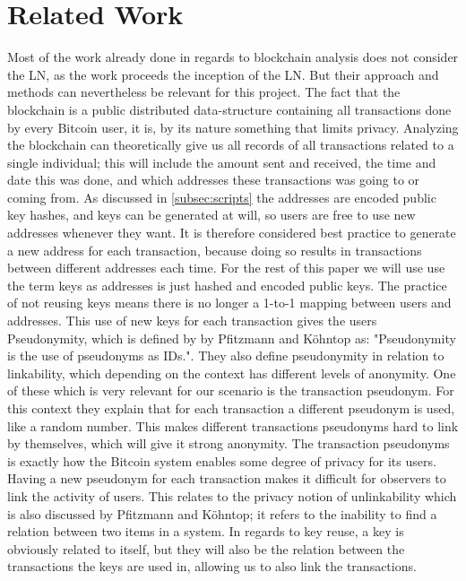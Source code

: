 
\section{Related Work}
\label{sec:related}

Most of the work already done in regards to blockchain analysis does not consider the LN, as the work proceeds the inception of the LN. But their approach and methods can nevertheless be relevant for this project.
The fact that the blockchain is a public distributed data-structure containing all transactions done by every Bitcoin user, it is, by its nature something that limits privacy. Analyzing the blockchain can theoretically give us all records of all transactions related to a single individual; this will include the amount sent and received, the time and date this was done, and which addresses these transactions was going to or coming from. As discussed in \cref{subsec:scripts} the addresses are encoded public key hashes, and keys can be generated at will, so users are free to use new addresses whenever they want. It is therefore considered best practice to generate a new address for each transaction, because doing so results in transactions between different addresses each time. For the rest of this paper we will use use the term keys as addresses is just hashed and encoded public keys. 
The practice of not reusing keys means there is no longer a 1-to-1 mapping between users and addresses.
This use of new keys for each transaction gives the users Pseudonymity, which is defined by by Pfitzmann and Köhntop \cite{pfitzmann2001anonymity} as: "Pseudonymity is the use of pseudonyms as IDs.". They also define pseudonymity in relation to linkability, which depending on the context has different levels of anonymity. One of these which is very relevant for our scenario is the transaction pseudonym. For this context they explain that for each transaction a different pseudonym is used, like a random number. This makes different transactions pseudonyms hard to link by themselves, which will give it strong anonymity. The transaction pseudonyms is exactly how the Bitcoin system enables some degree of privacy for its users. Having a new pseudonym for each transaction makes it difficult for observers to link the activity of users. This relates to the privacy notion of unlinkability which is also discussed by Pfitzmann and Köhntop; it refers to the inability to find a relation between two items in a system. 
In regards to key reuse, a key is obviously related to itself, but they will also be the relation between the transactions the keys are used in, allowing us to also link the transactions.
